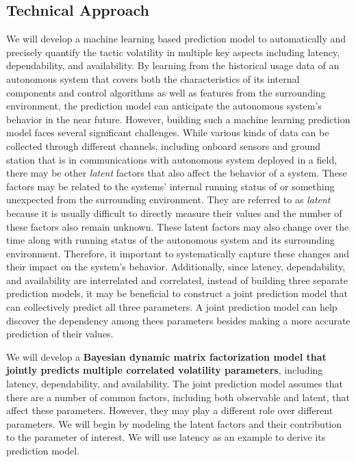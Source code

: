 \documentclass[12pt]{article}
\newcommand{\dan}[1]{\textcolor{blue}{{\it [Dan says: #1]}}}
\begin{document}
\subsection{Technical Approach} %



We will develop a machine learning based prediction model to automatically and precisely quantify the tactic volatility in multiple key aspects including latency, dependability, and availability. By learning from the historical usage data of an autonomous system that covers both the characteristics of its internal components and control algorithms as well as features from the surrounding environment, the prediction model can anticipate the autonomous system's behavior in the near future. However, building such a machine learning prediction model faces several significant challenges. While various kinds of data can be collected through different channels, including onboard sensors and ground station that is in communications with autonomous system deployed in a field, there may be other {\em latent} factors that also affect the behavior of a system. These factors may be related to the systems' internal running status of or something unexpected from the surrounding environment. They are referred to as {\em latent} because it is usually difficult to directly measure their values and the number of these factors also remain unknown. These latent factors may also change over the time along with running status of the autonomous system and its surrounding environment. Therefore, it important to systematically capture these changes and their impact on the system's behavior. Additionally, since latency, dependability, and availability are interrelated and correlated, instead of building three separate prediction models, it may be beneficial to construct a joint prediction model that can collectively predict all three parameters. A joint prediction model can help discover the dependency among thees parameters besides making a more accurate prediction of their values. 

We will develop a {\bf Bayesian dynamic matrix factorization model that jointly predicts multiple correlated volatility parameters}, including latency, dependability, and availability. The joint prediction model assumes that there are a number of common factors, including both observable and latent, that affect these parameters. However, they may play a different role over different parameters. We will begin by modeling the latent factors and their contribution to the parameter of interest. We will use latency as an example to derive its prediction model.  
\end{document}
